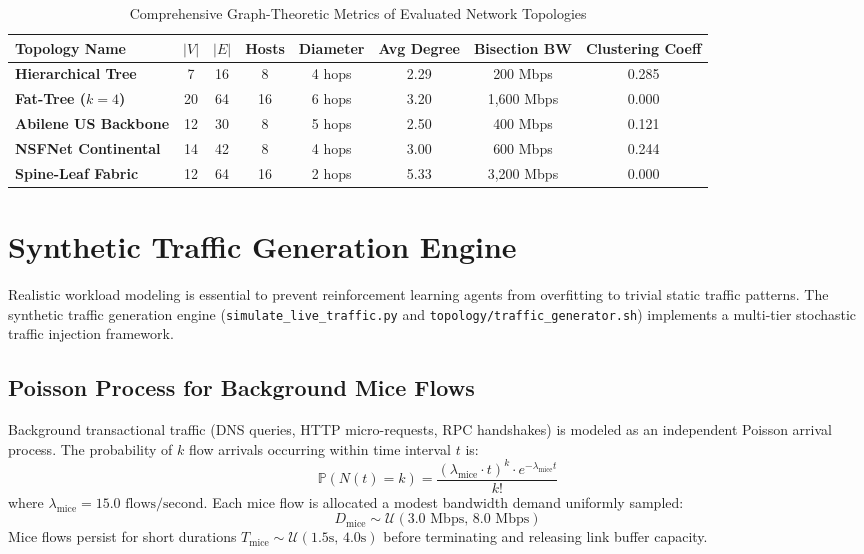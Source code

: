 \begin{table}[htbp]
\centering
\caption{Comprehensive Graph-Theoretic Metrics of Evaluated Network Topologies}
\label{tab:graph_metrics_comparative}
\small
\begin{tabularx}{\textwidth}{l c c c c c c c}
\toprule
\textbf{Topology Name} & \textbf{$|V|$} & \textbf{$|E|$} & \textbf{Hosts} & \textbf{Diameter} & \textbf{Avg Degree} & \textbf{Bisection BW} & \textbf{Clustering Coeff} \\
\midrule
\textbf{Hierarchical Tree} & 7 & 16 & 8 & 4 hops & 2.29 & 200 Mbps & 0.285 \\
\textbf{Fat-Tree ($k=4$)} & 20 & 64 & 16 & 6 hops & 3.20 & 1,600 Mbps & 0.000 \\
\textbf{Abilene US Backbone} & 12 & 30 & 8 & 5 hops & 2.50 & 400 Mbps & 0.121 \\
\textbf{NSFNet Continental} & 14 & 42 & 8 & 4 hops & 3.00 & 600 Mbps & 0.244 \\
\textbf{Spine-Leaf Fabric} & 12 & 64 & 16 & 2 hops & 5.33 & 3,200 Mbps & 0.000 \\
\bottomrule
\end{tabularx}
\end{table}

\section{Synthetic Traffic Generation Engine}
Realistic workload modeling is essential to prevent reinforcement learning agents from overfitting to trivial static traffic patterns. The synthetic traffic generation engine (\texttt{simulate\_live\_traffic.py} and \texttt{topology/traffic\_generator.sh}) implements a multi-tier stochastic traffic injection framework.

\subsection{Poisson Process for Background Mice Flows}
Background transactional traffic (DNS queries, HTTP micro-requests, RPC handshakes) is modeled as an independent Poisson arrival process. The probability of $k$ flow arrivals occurring within time interval $t$ is:
\begin{equation}
    \mathbb{P}(N(t) = k) = \frac{(\lambda_{\text{mice}} \cdot t)^k \cdot e^{-\lambda_{\text{mice}} t}}{k!}
\end{equation}
where $\lambda_{\text{mice}} = 15.0\text{ flows/second}$. Each mice flow is allocated a modest bandwidth demand uniformly sampled:
\begin{equation}
    D_{\text{mice}} \sim \mathcal{U}(3.0\text{ Mbps}, \, 8.0\text{ Mbps})
\end{equation}
Mice flows persist for short durations $T_{\text{mice}} \sim \mathcal{U}(1.5\text{s}, \, 4.0\text{s})$ before terminating and releasing link buffer capacity.


